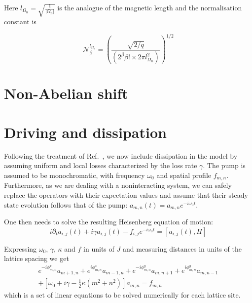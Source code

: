 \documentclass[twocolumn, 10pt, aps, superscriptaddress, floatfix, showpacs, pra, citeautoscript]{revtex4-1}
\begin{document}
Here $l_{\Omega_n} = \sqrt{\frac{1}{|\Omega_n|}}$ is the analogue of
the magnetic length and the normalisation constant is

\begin{equation}
\mathcal{N}_\beta^{l_{\Omega_n}} = \left( \frac{\sqrt{2/q}} {(2^\beta
\beta! \times 2 \pi l_{\Omega_n}^2)} \right)^{1/2}
\end{equation}


\section{Non-Abelian shift}\label{sec:non-abelian-shift}

\section{Driving and dissipation}\label{sec:driven-dissipation}

Following the treatment of Ref.~, we now
include dissipation in the model by assuming uniform and local losses
characterized by the loss rate $\gamma$. The pump is assumed to be
monochromatic, with frequency $\omega_0$ and spatial profile
$f_{m,n}$.  Furthermore, as we are dealing with a noninteracting
system, we can safely replace the operators with their expectation
values and assume that their steady state evolution follows that of
the pump: $a_{m,n}(t) = a_{m,n} e^{-i \omega_0 t}$.

One then needs to solve the resulting Heisenberg equation of motion:
%
\begin{equation}
i\partial_{t}a_{i,j}(t)+i\gamma
a_{i,j}(t)-f_{i,j}e^{-i\omega_{0}t}=\left[a_{i,j}(t),H\right]
\end{equation}

Expressing $\omega_{0}$, $\gamma$, $\kappa$ and $f$ in units of $J$
and measuring distances in units of the lattice spacing we get
%
\begin{multline}\label{eq:linear_problem}
e^{-i\phi_{m,n}^x}a_{m+1,n}+e^{i\phi_{m,n}^x}a_{m-1,n}+e^{-i\phi_{m,n}^y}a_{m,n+1}+e^{i\phi_{m,n}^y}a_{m,n-1}\\
+\left[\omega_{0}+i\gamma-\frac{1}{2}\kappa
(m^{2}+n^{2})\right]a_{m,n}=f_{m,n}
\end{multline}
which is a set of linear equations to be solved numerically for each
lattice site.
\end{document}
